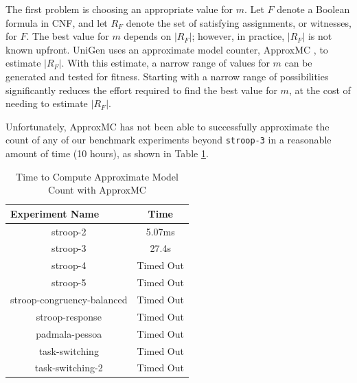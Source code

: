 The first problem is choosing an appropriate value for $m$. Let $F$ denote a Boolean formula in CNF, and let $R_F$ denote the set of satisfying assignments, or witnesses, for $F$. The best value for $m$ depends on $|R_F|$; however, in practice, $|R_F|$ is not known upfront. UniGen uses an approximate model counter, ApproxMC \cite{DBLP:journals/corr/ChakrabortyMV13}, to estimate $|R_F|$. With this estimate, a narrow range of values for $m$ can be generated and tested for fitness. Starting with a narrow range of possibilities significantly reduces the effort required to find the best value for $m$, at the cost of needing to estimate $|R_F|$.

Unfortunately, ApproxMC has not been able to successfully approximate the count of any of our benchmark experiments beyond \texttt{stroop-3} in a reasonable amount of time (10 hours), as shown in Table \ref{tab:benchmark_experiments_approxmc}.


\begin{table}[b]
  \centering
  \caption{Time to Compute Approximate Model Count with ApproxMC}
\begin{tabular}{|c|c|}
\hline
\multicolumn{1}{|l|}{Experiment Name} & Time            \\ \hline
stroop-2                              & 5.07ms          \\ \hline
stroop-3                              & 27.4s           \\ \hline
stroop-4                              & Timed Out       \\ \hline
stroop-5                              & Timed Out       \\ \hline
stroop-congruency-balanced            & Timed Out       \\ \hline
stroop-response                       & Timed Out       \\ \hline
padmala-pessoa                        & Timed Out       \\ \hline
task-switching                        & Timed Out       \\ \hline
task-switching-2                      & Timed Out       \\ \hline
\end{tabular}
\label{tab:benchmark_experiments_approxmc}%
\end{table}

